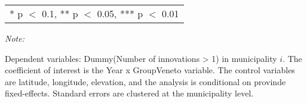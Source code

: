 \begin{table}[!h]
\begin{threeparttable}
\begin{tabular}[t]{lcccc}
\bottomrule
\multicolumn{5}{l}{\rule{0pt}{1em}* p $<$ 0.1, ** p $<$ 0.05, *** p $<$ 0.01}\\
\end{tabular}
\begin{tablenotes}[para]
\item \textit{Note: } 
\item Dependent variables: Dummy(Number of innovations > 1) in municipality $i$. The coefficient of interest is the Year x Group{Veneto} variable. The control variables are latitude, longitude, elevation, and the analysis is conditional on provinde fixed-effects. Standard errors are clustered at the municipality level.
\end{tablenotes}
\end{threeparttable}
\end{table}
